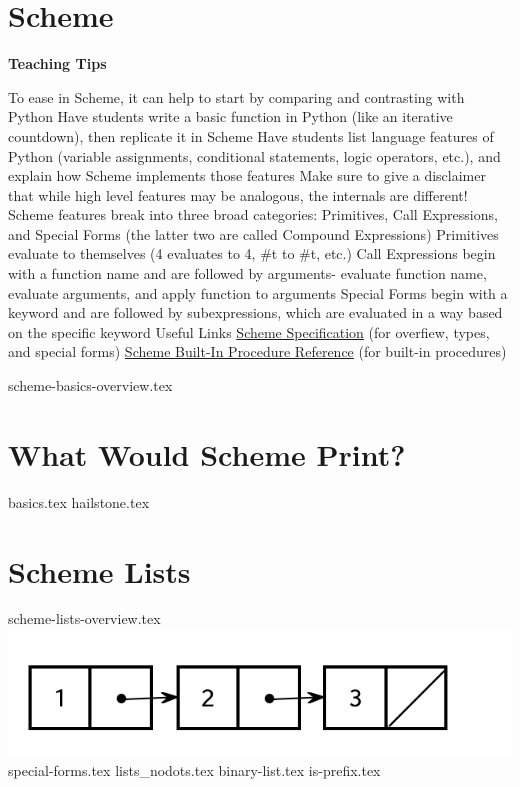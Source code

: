 \documentclass{exam}
\begin{document}
\section{Scheme}
\begin{guide}
\begin{blocksection}
\textbf{Teaching Tips}
\begin{outline}[enumerate]
    \1 To ease in Scheme, it can help to start by comparing and contrasting with Python
    \2 Have students write a basic function in Python (like an iterative countdown), then replicate it in Scheme
    \2 Have students list language features of Python (variable assignments, conditional statements, logic operators, etc.), and explain how Scheme implements those features
    \2 Make sure to give a disclaimer that while high level features may be analogous, the internals are different!
    \1 Scheme features break into three broad categories: Primitives, Call Expressions, and Special Forms (the latter two are called Compound Expressions)
    \2 Primitives evaluate to themselves (4 evaluates to 4, \#t to \#t, etc.)
    \2 Call Expressions begin with a function name and are followed by arguments- evaluate function name, evaluate arguments, and apply function to arguments
    \2 Special Forms begin with a keyword and are followed by subexpressions, which are evaluated in a way based on the specific keyword
    \1 Useful Links
    \2 \href{https://cs61a.org/articles/scheme-spec/}{Scheme Specification} (for overfiew, types, and special forms)
    \2 \href{https://cs61a.org/articles/scheme-builtins/}{Scheme Built-In Procedure Reference} (for built-in procedures)
\end{outline}
\end{blocksection}
\end{guide}

{scheme-basics-overview.tex}
\begin{questions}
\newpage
\section{What Would Scheme Print?}
{basics.tex}
{hailstone.tex}

\section{Scheme Lists}
{scheme-lists-overview.tex}
\includegraphics{../../topics/scheme/text/scheme_list.png}
{special-forms.tex}
\newpage
{lists_nodots.tex}
{binary-list.tex}
{is-prefix.tex}

\end{questions}
\end{document}
